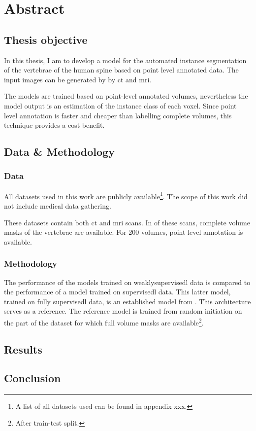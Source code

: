 \chapter*{Abstract}

\section*{Thesis objective}
In this thesis, I am to develop a model for the automated instance segmentation of the vertebrae of the human spine based on point level annotated data.
The input images can be generated by by \acrfull{ct} and \acrfull{mri}.


The models are trained based on point-level annotated volumes, nevertheless the model output is an estimation of the instance class of each voxel.
Since point level annotation is faster and cheaper than labelling complete volumes, this technique provides a cost benefit. 

\section*{Data \& Methodology}

\subsection*{Data}
All datasets used in this work are publicly available\footnote{A list of all datasets used can be found in appendix xxx.}. 
The scope of this work did not include medical data gathering.

These datasets contain both \acrshort{ct} and \acrshort{mri} scans. 
In  of these scans, complete volume masks of the vertebrae are available. 
For 200 volumes, point level annotation is available.

\subsection*{Methodology}
The performance of the models trained on \Gls{weaklysupervisedl} data is compared to the performance of a model trained on \Gls{supervisedl} data.
This latter model, trained on fully \Gls{supervisedl} data, is an established model from . 
This architecture serves as a reference.
The reference model is trained from random initiation on the part of the dataset for which full volume masks are available\footnote{After train-test split.}.  

\section*{Results}

\section*{Conclusion}
